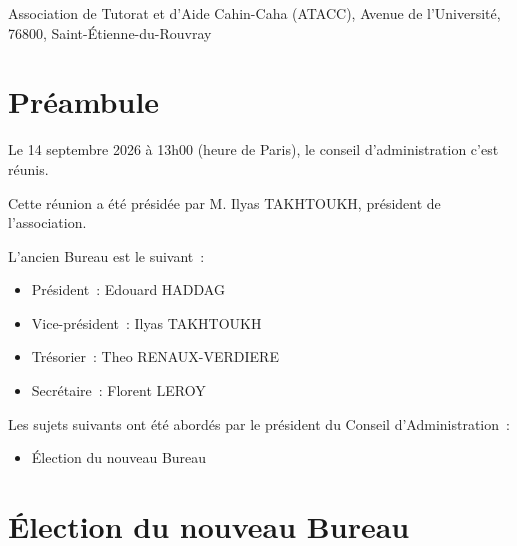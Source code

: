 \documentclass{article}
\date{\mydate}
\newcommand{\mydate}{14 septembre 2026}
\begin{document}
\begin{flushleft}
  Association de Tutorat et d'Aide Cahin-Caha (ATACC),
  \newline
  Avenue de l'Université, 76800, Saint-Étienne-du-Rouvray
\end{flushleft}

\vspace{10pt}

\setlength{\fboxsep}{10pt}
\noindent{}

\section{Préambule}
Le \mydate{} à 13h00 (heure de Paris), le conseil d'administration c'est
réunis.
\newline
\begin{flushleft}
  Cette réunion a été présidée par M. Ilyas TAKHTOUKH, président de
  l'association.
\end{flushleft}

\begin{flushleft}
  L'ancien Bureau est le suivant~:

  \begin{itemize}
    \item Président~: Edouard HADDAG
    \item Vice-président~: Ilyas TAKHTOUKH
    \item Trésorier~: Theo RENAUX-VERDIERE
    \item Secrétaire~: Florent LEROY
  \end{itemize}
\end{flushleft}

\begin{flushleft}
  Les sujets suivants ont été abordés par le président du Conseil
  d'Administration~:

  \begin{itemize}
    \item Élection du nouveau Bureau
  \end{itemize}
\end{flushleft}

\section{Élection du nouveau Bureau}
\end{document}
